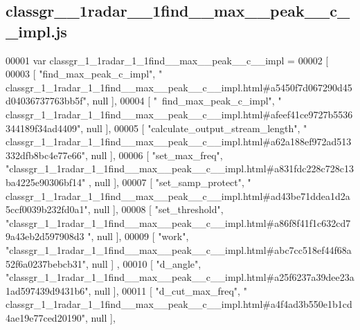 \subsection{classgr\+\_\+\_\+1radar\+\_\+\_\+1find\+\_\+\+\_\+max\+\_\+\+\_\+peak\+\_\+\+\_\+c\+\_\+\+\_\+impl.\+js}
\label{classgr__1__1radar__1__1find____max____peak____c____impl_8js_source}

\begin{DoxyCode}
00001 var classgr_1_1radar_1_1find__max__peak__c__impl =
00002 [
00003     [ \textcolor{stringliteral}{"find\_max\_peak\_c\_impl"}, \textcolor{stringliteral}{"
      classgr\_1\_1radar\_1\_1find\_\_max\_\_peak\_\_c\_\_impl.html#a5450f7d067290d45d04036737763bb5f"}, null ],
00004     [ \textcolor{stringliteral}{"~find\_max\_peak\_c\_impl"}, \textcolor{stringliteral}{"
      classgr\_1\_1radar\_1\_1find\_\_max\_\_peak\_\_c\_\_impl.html#afeef41ce9727b5536344189f34ad4409"}, null ],
00005     [ \textcolor{stringliteral}{"calculate\_output\_stream\_length"}, \textcolor{stringliteral}{"
      classgr\_1\_1radar\_1\_1find\_\_max\_\_peak\_\_c\_\_impl.html#a62a188ef972ad513332dfb8bc4e77e66"}, null ],
00006     [ \textcolor{stringliteral}{"set\_max\_freq"}, \textcolor{stringliteral}{"classgr\_1\_1radar\_1\_1find\_\_max\_\_peak\_\_c\_\_impl.html#a831fdc228c728c13ba4225e90306bf14"}
      , null ],
00007     [ \textcolor{stringliteral}{"set\_samp\_protect"}, \textcolor{stringliteral}{"
      classgr\_1\_1radar\_1\_1find\_\_max\_\_peak\_\_c\_\_impl.html#ad43be71ddea1d2a5ccf0039b232fd0a1"}, null ],
00008     [ \textcolor{stringliteral}{"set\_threshold"}, \textcolor{stringliteral}{"classgr\_1\_1radar\_1\_1find\_\_max\_\_peak\_\_c\_\_impl.html#a86f8f41f1c632cd79a43eb2d597908d3
      "}, null ],
00009     [ \textcolor{stringliteral}{"work"}, \textcolor{stringliteral}{"classgr\_1\_1radar\_1\_1find\_\_max\_\_peak\_\_c\_\_impl.html#abc7cc518ef44f68a52f6a0237bebcb31"}, null ]
      ,
00010     [ \textcolor{stringliteral}{"d\_angle"}, \textcolor{stringliteral}{"classgr\_1\_1radar\_1\_1find\_\_max\_\_peak\_\_c\_\_impl.html#a25f6237a39dee23a1ad597439d9431b6"}, 
      null ],
00011     [ \textcolor{stringliteral}{"d\_cut\_max\_freq"}, \textcolor{stringliteral}{"
      classgr\_1\_1radar\_1\_1find\_\_max\_\_peak\_\_c\_\_impl.html#a4f4ad3b550e1b1cd4ae19e77ced20190"}, null ],

\end{DoxyCode}
